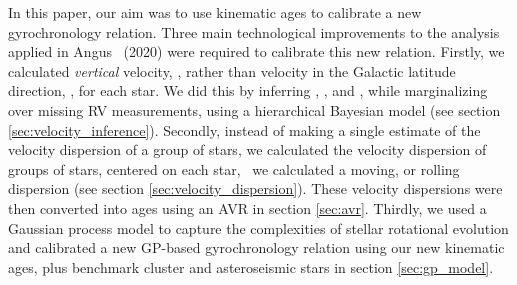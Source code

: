 In this paper, our aim was to use kinematic ages to calibrate a new
gyrochronology relation.
Three main technological improvements to the analysis applied in Angus \etal\
(2020) were required to calibrate this new relation.
Firstly, we calculated {\it vertical} velocity, \vz, rather than velocity in
the Galactic latitude direction, \vb, for each star.
We did this by inferring \vx, \vy, and \vz, while marginalizing over missing
RV measurements, using a hierarchical Bayesian model (see section
\ref{sec:velocity_inference}).
Secondly, instead of making a single estimate of the velocity dispersion of a
group of stars, we calculated the velocity dispersion of groups of stars,
centered on each star, \ie\ we calculated a moving, or rolling dispersion (see
section \ref{sec:velocity_dispersion}).
These velocity dispersions were then converted into ages using an AVR
\citep{yu2019} in section \ref{sec:avr}.
Thirdly, we used a Gaussian process model to capture the complexities of
stellar rotational evolution and calibrated a new GP-based gyrochronology
relation using our new kinematic ages, plus benchmark cluster and
asteroseismic stars in section \ref{sec:gp_model}.
